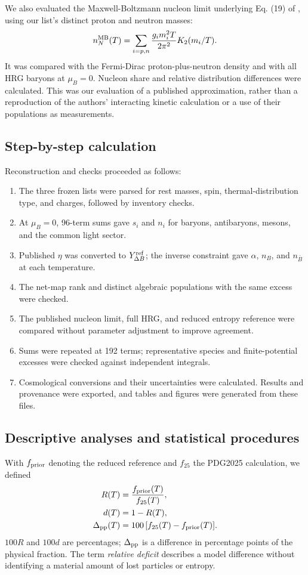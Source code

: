 We also evaluated the Maxwell-Boltzmann nucleon limit underlying Eq. (19) of \citet{Satarov2013}, using our list's distinct proton and neutron masses:
\begin{equation}
n_N^{\rm MB}(T)=\sum_{i=p,n}
\frac{g_i m_i^2T}{2\pi^2}K_2(m_i/T).
\label{eq:nucleonMB}
\end{equation}
It was compared with the Fermi-Dirac proton-plus-neutron density and with all HRG baryons at $\mu_B=0$. Nucleon share and relative distribution differences were calculated. This was our evaluation of a published approximation, rather than a reproduction of the authors' interacting kinetic calculation or a use of their populations as measurements.

\subsection{Step-by-step calculation}
Reconstruction and checks proceeded as follows:
\begin{enumerate}
\setlength{\itemsep}{2pt}
\item The three frozen lists were parsed for rest masses, spin, thermal-distribution type, and charges, followed by inventory checks.
\item At $\mu_B=0$, 96-term sums gave $s_i$ and $n_i$ for baryons, antibaryons, mesons, and the common light sector.
\item Published $\eta$ was converted to $Y_{\Delta B}^{\rm ref}$; the inverse constraint gave $\alpha$, $n_B$, and $n_{\bar B}$ at each temperature.
\item The net-map rank and distinct algebraic populations with the same excess were checked.
\item The published nucleon limit, full HRG, and reduced entropy reference were compared without parameter adjustment to improve agreement.
\item Sums were repeated at 192 terms; representative species and finite-potential excesses were checked against independent integrals.
\item Cosmological conversions and their uncertainties were calculated. Results and provenance were exported, and tables and figures were generated from these files.
\end{enumerate}

\subsection{Descriptive analyses and statistical procedures}
With $f_{\rm prior}$ denoting the reduced reference and $f_{25}$ the PDG2025 calculation, we defined
\begin{align}
R(T)&=\frac{f_{\rm prior}(T)}{f_{25}(T)},\\
d(T)&=1-R(T),\\
\Delta_{\rm pp}(T)&=100\,[f_{25}(T)-f_{\rm prior}(T)].
\end{align}
$100R$ and $100d$ are percentages; $\Delta_{\rm pp}$ is a difference in percentage points of the physical fraction. The term \emph{relative deficit} describes a model difference without identifying a material amount of lost particles or entropy.

